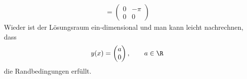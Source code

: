 \begin{solution}
\begin{enumerate}[label = \textbf{\alph*)}]
\begin{itemize}
\begin{align*}
        = \begin{pmatrix}
          0 & -\pi \\ 0 & 0
        \end{pmatrix}
      \end{align*}
      Wieder ist der Lösungsraum ein-dimensional und man kann leicht nachrechnen, dass
      \begin{align*}
        y(x) = \begin{pmatrix}
          a \\ 0
        \end{pmatrix}, \qquad a \in \R
      \end{align*}
      die Randbedingungen erfüllt.
  \end{itemize}
\end{enumerate}
\end{solution}
